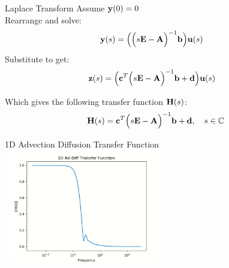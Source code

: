 \begin{frame}{Laplace Transform}
Assume ${\bf y}(0) = 0$\\
\bigskip
Rearrange and solve:
    \begin{align*}
        {\bf y}(s) &= \Big(\Big( s{\bf E} - {\bf A} \Big)^{-1} {\bf b} \Big) {\bf u}(s)
    \end{align*}
Substitute to get:
    \begin{align*}
        {\bf z}(s) &=  \Big( {\bf c}^T \Big(s{\bf E} - {\bf A} \Big)^{-1} {\bf b} + {\bf d} \Big) {\bf u}(s)
    \end{align*}

 Which gives the following transfer function ${\bf H}(s)$:
    \begin{align*}
        {\bf H}(s) &= {\bf c}^T \Big( s{\bf E}- {\bf A} \Big)^{-1} {\bf b} + {\bf d}, \quad s \in \mathbb{C}\\
    \end{align*}
\end{frame}
\begin{frame}{1D Advection Diffusion Transfer Function}
    \centering
    \includegraphics[width=7cm, height=5cm]{1d_transfer.PNG}
\end{frame}